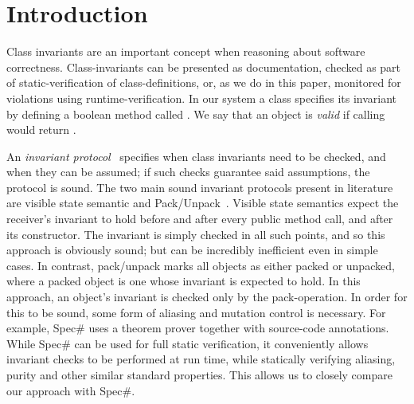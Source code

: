 \section{Introduction}

Class invariants are an important concept when reasoning about software correctness.
Class-invariants can be presented as documentation, checked as part of static-verification of class-definitions, or, as we do in this paper, monitored for violations using runtime-verification.
In our system a class specifies its invariant by defining a boolean method called \Q@invariant@. We say that an object is \emph{valid} if calling \Q@invariant@ would return \Q@true@.

An \emph{invariant protocol}~\cite{?} specifies when class invariants need to be checked, and when they can be assumed; if such checks guarantee said assumptions, the protocol is sound.
The two main sound invariant protocols present in literature are visible state semantic \cite{??} and Pack/Unpack~\cite{?}. Visible state semantics expect the receiver's invariant to hold before and after every public method call, and after its constructor. The invariant is simply checked in all such points, and so this approach is obviously sound; but can be incredibly inefficient even in simple cases.
In contrast, pack/unpack marks all objects as either packed or unpacked, where a packed object is one whose invariant is expected to hold.
In this approach, an object's invariant is checked only by the pack-operation.
In order for this to be sound, some form of aliasing and mutation control is necessary. For example, Spec\# uses a theorem prover together with source-code annotations.
While Spec\# can be used for full static verification, it conveniently allows invariant checks to be performed
at run time, while statically verifying aliasing, purity and other similar standard properties.
This allows us to closely compare our approach with Spec\#.

